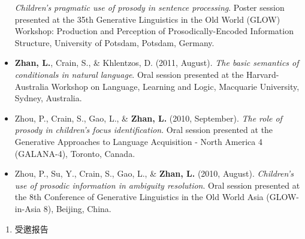 \documentclass[
  12pt,
]{article}
\providecommand{\tightlist}{%
  \setlength{\itemsep}{0pt}\setlength{\parskip}{0pt}}
\begin{document}
\begin{itemize}
  \emph{Children's pragmatic use of prosody in sentence processing}.
  Poster session presented at the 35th Generative Linguistics in the Old
  World (GLOW) Workshop: Production and Perception of
  Prosodically-Encoded Information Structure, University of Potsdam,
  Potsdam, Germany.
\item
  \textbf{Zhan, L.}, Crain, S., \& Khlentzos, D. (2011, August).
  \emph{The basic semantics of conditionals in natural language}. Oral
  session presented at the Harvard-Australia Workshop on Language,
  Learning and Logic, Macquarie University, Sydney, Australia.
\item
  Zhou, P., Crain, S., Gao, L., \& \textbf{Zhan, L.} (2010, September).
  \emph{The role of prosody in children's focus identification}. Oral
  session presented at the Generative Approaches to Language Acquisition
  - North America 4 (GALANA-4), Toronto, Canada.
\item
  Zhou, P., Su, Y., Crain, S., Gao, L., \& \textbf{Zhan, L.} (2010,
  August). \emph{Children's use of prosodic information in ambiguity
  resolution}. Oral session presented at the 8th Conference of
  Generative Linguistics in the Old World Asia (GLOW-in-Asia 8),
  Beijing, China.
\end{itemize}

\begin{enumerate}
\def\labelenumi{\arabic{enumi}.}
\setcounter{enumi}{4}
\tightlist
\item
  受邀报告
\end{enumerate}
\end{document}
